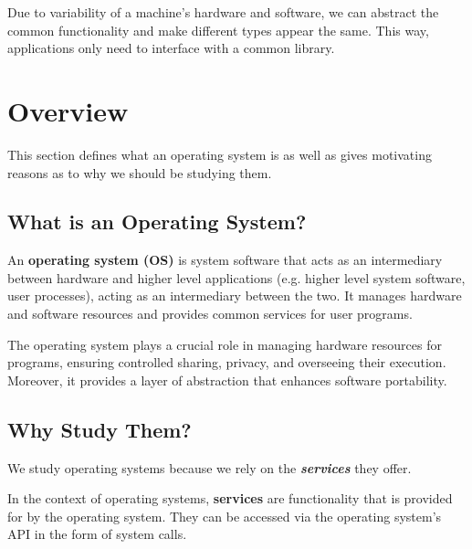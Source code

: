 \documentclass{report}
\begin{document}
Due to variability of a machine's hardware and software, we can abstract the common
functionality and make different types appear the same. This way, applications only need to
interface with a common library. 










\chapter{Overview}
This section defines what an operating system is as well as gives motivating reasons as to why we
should be studying them. 





\section{What is an Operating System?}
\begin{tcolorbox}[title=Definition: Operating System]
  An \textbf{operating system (OS)} is system software that acts as an intermediary between hardware and
  higher level applications (e.g. higher level system software, user processes), acting as an
  intermediary between the two. It manages hardware and software resources and provides common
  services for user programs. 
\end{tcolorbox}

\begin{tcolorbox}[colback=violet!5!white,colframe=violet,title=Abstraction: The Operating System] 
  The operating system plays a crucial role in managing hardware resources for programs, ensuring
  controlled sharing, privacy, and overseeing their execution. Moreover, it provides a layer of
  abstraction that enhances software portability. 
\end{tcolorbox}





\section{Why Study Them?}
We study operating systems because we rely on the \textit{\textbf{services}} they offer.

\begin{tcolorbox}[title=Definition: Services]
  In the context of operating systems, \textbf{services} are functionality that is provided
  for by the operating system. They can be accessed via the operating system's API in the form of
  system calls. 
\end{tcolorbox}
\end{document}

